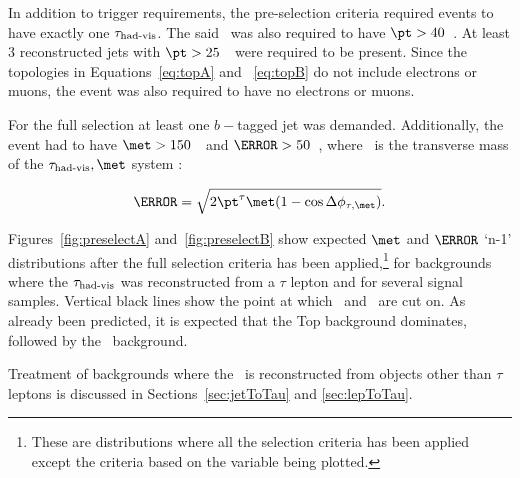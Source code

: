 \par In addition to trigger requirements, the pre-selection criteria required  
events to have exactly one $\tau_{\text{had-vis}}$. The said \tauvis\ was also required to have $\pt>40$~\GeV. 
At least 3 reconstructed jets with $\pt>25$~\GeV\ were required to be present. 
Since the topologies in Equations~\ref{eq:topA} and ~\ref{eq:topB} do 
not include electrons or muons, the event was also required to have no electrons or muons.  

\par For the full selection at least one $b-$tagged jet was demanded. Additionally, the event had 
to have $\met>150$~\GeV\ and
 $\mT>50$~\GeV, where \mT\ is the transverse mass of the $\tauvis,\met$ system :

\begin{equation}
\mT = \sqrt{2\pt^\tau\met(1-\cos\Delta\phi_{\tau,\met})}.
\end{equation} 

Figures~\ref{fig:preselectA} and~\ref{fig:preselectB} show expected $\met$ and $\mT$ `n-1'
 distributions after the full selection criteria has been applied,\footnote{These are distributions where 
all the selection criteria has been applied except the criteria based on the variable being plotted.} 
for backgrounds where the $\tau_{\text{had-vis}}$ was reconstructed from a $\tau$ lepton and for 
several signal samples. Vertical black lines show the point at which \met\ and \mT\ are cut 
on. As already been predicted, it is expected that the Top background dominates, followed by the 
\Wjets\ background.

\par Treatment of backgrounds where the \tauvis\ is reconstructed from objects other 
than $\tau$ leptons is discussed in Sections~\ref{sec:jetToTau} and \ref{sec:lepToTau}.    

